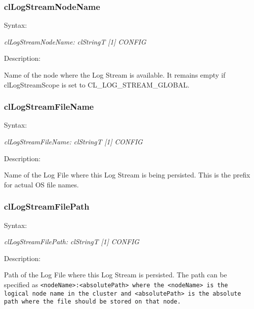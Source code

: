 \begin{flushleft}
\subsubsection{clLogStreamNodeName}
\begin{Desc}
\item[Syntax:]
\end{Desc}
\textit{clLogStreamNodeName: clStringT [1] {CONFIG}}
\begin{Desc}
 \item[Description:]
\end{Desc}
Name of the node where the Log Stream is available. It remains empty if clLogStreamScope is set to CL\_\-LOG\_\-STREAM\_\-GLOBAL.


\subsubsection{clLogStreamFileName}
\begin{Desc}
\item[Syntax:]
\end{Desc}
\textit{clLogStreamFileName: clStringT [1] {CONFIG}}
\begin{Desc}
 \item[Description:]
\end{Desc}
Name of the Log File where this Log Stream is being persisted. This is the prefix for actual OS file names.


\subsubsection{clLogStreamFilePath}
\begin{Desc}
\item[Syntax:]
\end{Desc}
\textit{clLogStreamFilePath: clStringT [1] {CONFIG}}
\begin{Desc}
 \item[Description:]
\end{Desc}
Path of the Log File where this Log Stream is persisted. The path can be specified as
\newline
\tt{<nodeName>:<absolutePath>}
\newline
where the <nodeName> is the logical node name in the cluster and <absolutePath> is the absolute path where the file should be stored on that node.




\end{flushleft}
